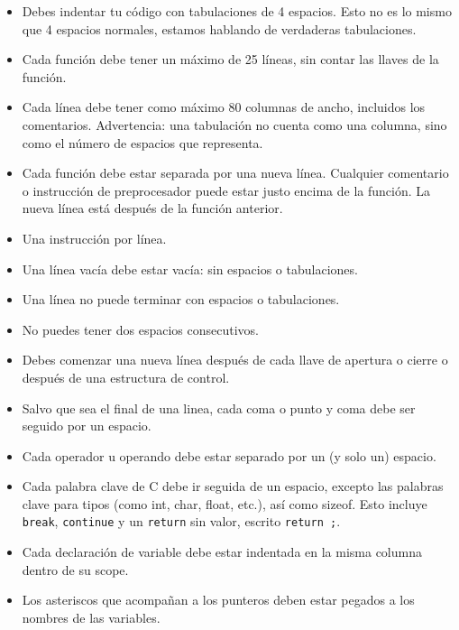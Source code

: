 \documentclass{42-es}
\begin{document}
\begin{itemize}

      \item Debes indentar tu código con tabulaciones de 4 espacios.
            Esto no es lo mismo que 4 espacios normales, estamos hablando de
            verdaderas tabulaciones.
      \item Cada función debe tener un máximo de 25 líneas, sin contar las
            llaves
            de la función.
      \item Cada línea debe tener como máximo 80 columnas de ancho, incluidos
            los
            comentarios. Advertencia: una tabulación no cuenta como una
            columna,
            sino como
            el número de espacios que representa.
      \item Cada función debe estar separada por una nueva línea. Cualquier
            comentario
            o instrucción de preprocesador puede estar justo encima de la
            función. La
            nueva línea está después de la función anterior.
      \item Una instrucción por línea.
      \item Una línea vacía debe estar vacía: sin espacios o tabulaciones.
      \item Una línea no puede terminar con espacios o tabulaciones.
      \item No puedes tener dos espacios consecutivos.
      \item Debes comenzar una nueva línea después de cada llave de apertura o
            cierre o después de una estructura de control.
      \item Salvo que sea el final de una linea, cada coma o punto y coma
            debe ser seguido por un espacio.
      \item Cada operador u operando debe estar separado por un (y solo un)
            espacio.
      \item Cada palabra clave de C debe ir seguida de un espacio, excepto las
            palabras clave para tipos (como int, char, float, etc.), así como
            sizeof. Esto incluye \texttt{break}, \texttt{continue} y un
            \texttt{return} sin valor, escrito \texttt{return ;}.
      \item Cada declaración de variable debe estar indentada en la misma
            columna
            dentro de su scope.
      \item Los asteriscos que acompañan a los punteros deben estar pegados a
            los
            nombres de las variables.

\end{itemize}
\end{document}
